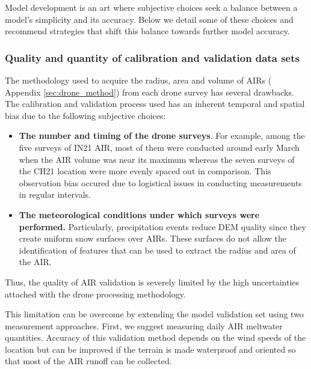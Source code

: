 
Model development is an art where subjective choices seek a balance between a model's simplicity and its
accuracy. Below we detail some of these choices and recommend strategies that shift this balance towards further
model accuracy.

\subsubsection{Quality and quantity of calibration and validation data sets}

The methodology used to acquire the radius, area and volume of \ac{AIRs} ( Appendix \ref{sec:drone_method}) from
each drone survey has several drawbacks. The calibration and validation process used has an inherent temporal
and spatial bias due to the following subjective choices:

\begin{itemize}
	\item \textbf{The number and timing of the drone surveys}. For example, among the five surveys of IN21 AIR, most of them were
	      conducted around early March when the AIR volume was near its maximum whereas the seven surveys of the CH21
	      location were more evenly spaced out in comparison. This observation bias occured due to logistical issues
	      in conducting measurements in regular intervals.

	\item \textbf{The meteorological conditions under which surveys were performed.} Particularly, precipitation events reduce DEM quality since
	      they create uniform snow surfaces over \ac{AIRs}. These surfaces do not allow the identification of features
	      that can be used to extract the radius and area of the AIR.

\end{itemize}

Thus, the quality of AIR validation is severely limited by the high uncertainties attached with the drone
processing methodology.

This limitation can be overcome by extending the model validation set using two measurement approaches. First,
we suggest measuring daily AIR meltwater quantities. Accuracy of this validation method depends on the wind
speeds of the location but can be improved if the terrain is made waterproof and oriented so that most of the
AIR runoff can be collected. 

